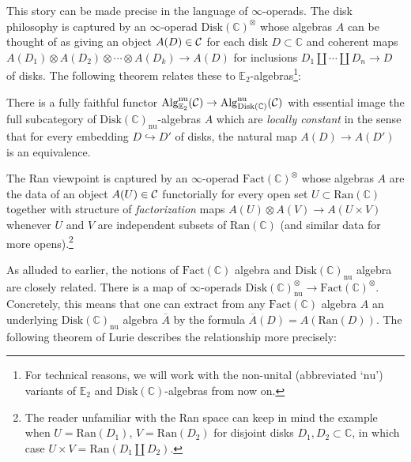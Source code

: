 This story can be made precise in the language of $\infty$-operads.  The disk philosophy is captured by an $\infty$-operad  $\mathrm{Disk}(\mathbb{C})^\otimes$ whose algebras $A$ can be thought of as giving an object $A(D)\in\operatorname{\mathcal{C}}$ for each disk $D\subset \mathbb{C}$ and coherent maps $A(D_1)\otimes A(D_2)\otimes \cdots \otimes A(D_k) \to A(D)$ for inclusions $D_1\coprod \cdots \coprod D_n \to D$ of disks.  The following theorem relates these to $\mathbb{E}_2$-algebras\footnote{For technical reasons, we will work with the non-unital (abbreviated `$\mathrm{nu}$') variants of $\mathbb{E}_2$ and $\mathrm{Disk}(\mathbb{C})$-algebras from now on.}:

\begin{thm}\label{thm:lcdisk}
There is a fully faithful functor $\operatorname{\mathrm{Alg}}^{\mathrm{nu}}_{\mathbb{E}_2}(\operatorname{\mathcal{C}}) \to \operatorname{\mathrm{Alg}}^{\mathrm{nu}}_{\mathrm{Disk}(\mathbb{C})}(\operatorname{\mathcal{C}})$ with essential image the full subcategory of $\mathrm{Disk}(\mathbb{C})_{\mathrm{nu}}$-algebras $A$ which are \emph{locally constant} in the sense that for every embedding $D\hookrightarrow D'$ of disks, the natural map $A(D)\to A(D')$ is an equivalence.  
\end{thm}

The Ran viewpoint is captured by an $\infty$-operad $\mathrm{Fact}(\mathbb{C})^{\otimes}$ whose algebras $A$ are the data of an object $A(U)\in\operatorname{\mathcal{C}}$ functorially for every open set $U\subset \mathrm{Ran}(\mathbb{C})$ together with structure of \emph{factorization} maps $A(U)\otimes A(V) \to A(U\times V)$ whenever $U$ and $V$ are independent subsets of $\mathrm{Ran}(\mathbb{C})$ (and similar data for more opens).\footnote{The reader unfamiliar with the Ran space can keep in mind the example when $U=\mathrm{Ran}(D_1)$, $V=\mathrm{Ran}(D_2)$ for disjoint disks $D_1,D_2\subset \mathbb{C}$, in which case $U\times V = \mathrm{Ran}(D_1\coprod D_2).$}  


As alluded to earlier, the notions of $\mathrm{Fact}(\mathbb{C})$ algebra and $\mathrm{Disk}(\mathbb{C})_{\mathrm{nu}}$ algebra are closely related.  There is a map of $\infty$-operads $\mathrm{Disk}(\mathbb{C})_{\mathrm{nu}}^\otimes \to \mathrm{Fact}(\mathbb{C})^\otimes.$  Concretely, this means that one can extract from any $\mathrm{Fact}(\mathbb{C})$ algebra $A$ an underlying $\mathrm{Disk}(\mathbb{C})_{\mathrm{nu}}$ algebra $\overline{A}$ by the formula $\overline{A}(D) = A(\mathrm{Ran}(D)).$  The following theorem of Lurie describes the relationship more precisely:

